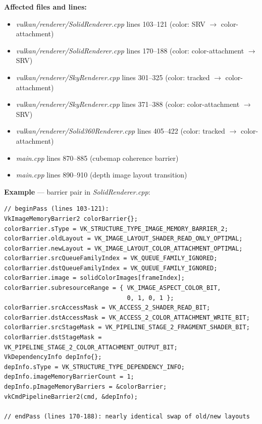 \documentclass[11pt,a4paper]{article}
\newcommand{\file}[1]{\textsl{#1}}
\begin{document}
\textbf{Affected files and lines:}
\begin{itemize}
    \item \file{vulkan/renderer/SolidRenderer.cpp} lines 103--121 (color: SRV $\to$ color-attachment)
    \item \file{vulkan/renderer/SolidRenderer.cpp} lines 170--188 (color: color-attachment $\to$ SRV)
    \item \file{vulkan/renderer/SkyRenderer.cpp} lines 301--325 (color: tracked $\to$ color-attachment)
    \item \file{vulkan/renderer/SkyRenderer.cpp} lines 371--388 (color: color-attachment $\to$ SRV)
    \item \file{vulkan/renderer/Solid360Renderer.cpp} lines 405--422 (color: tracked $\to$ color-attachment)
    \item \file{main.cpp} lines 870--885 (cubemap coherence barrier)
    \item \file{main.cpp} lines 890--910 (depth image layout transition)
\end{itemize}

\textbf{Example} --- barrier pair in \file{SolidRenderer.cpp}:
\begin{lstlisting}
// beginPass (lines 103-121):
VkImageMemoryBarrier2 colorBarrier{};
colorBarrier.sType = VK_STRUCTURE_TYPE_IMAGE_MEMORY_BARRIER_2;
colorBarrier.oldLayout = VK_IMAGE_LAYOUT_SHADER_READ_ONLY_OPTIMAL;
colorBarrier.newLayout = VK_IMAGE_LAYOUT_COLOR_ATTACHMENT_OPTIMAL;
colorBarrier.srcQueueFamilyIndex = VK_QUEUE_FAMILY_IGNORED;
colorBarrier.dstQueueFamilyIndex = VK_QUEUE_FAMILY_IGNORED;
colorBarrier.image = solidColorImages[frameIndex];
colorBarrier.subresourceRange = { VK_IMAGE_ASPECT_COLOR_BIT,
                                  0, 1, 0, 1 };
colorBarrier.srcAccessMask = VK_ACCESS_2_SHADER_READ_BIT;
colorBarrier.dstAccessMask = VK_ACCESS_2_COLOR_ATTACHMENT_WRITE_BIT;
colorBarrier.srcStageMask = VK_PIPELINE_STAGE_2_FRAGMENT_SHADER_BIT;
colorBarrier.dstStageMask = VK_PIPELINE_STAGE_2_COLOR_ATTACHMENT_OUTPUT_BIT;
VkDependencyInfo depInfo{};
depInfo.sType = VK_STRUCTURE_TYPE_DEPENDENCY_INFO;
depInfo.imageMemoryBarrierCount = 1;
depInfo.pImageMemoryBarriers = &colorBarrier;
vkCmdPipelineBarrier2(cmd, &depInfo);

// endPass (lines 170-188): nearly identical swap of old/new layouts
\end{lstlisting}
\end{document}

